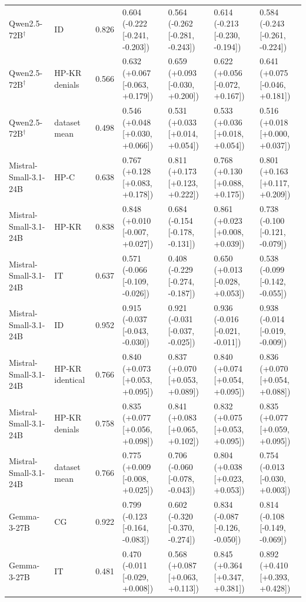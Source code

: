 \begin{table}
{\begin{tabular}{lllllll}
Qwen2.5-72B$^\dagger$ & ID & 0.826 & 0.604 (-0.222 [-0.241, -0.203]) & 0.564 (-0.262 [-0.281, -0.243]) & 0.614 (-0.213 [-0.230, -0.194]) & 0.584 (-0.243 [-0.261, -0.224]) \\
Qwen2.5-72B$^\dagger$ & HP-KR denials & 0.566 & 0.632 (+0.067 [-0.063, +0.179]) & 0.659 (+0.093 [-0.030, +0.200]) & 0.622 (+0.056 [-0.072, +0.167]) & 0.641 (+0.075 [-0.046, +0.181]) \\
Qwen2.5-72B$^\dagger$ & dataset mean & 0.498 & 0.546 (+0.048 [+0.030, +0.066]) & 0.531 (+0.033 [+0.014, +0.054]) & 0.533 (+0.036 [+0.018, +0.054]) & 0.516 (+0.018 [+0.000, +0.037]) \\
Mistral-Small-3.1-24B & HP-C & 0.638 & 0.767 (+0.128 [+0.083, +0.178]) & 0.811 (+0.173 [+0.123, +0.222]) & 0.768 (+0.130 [+0.088, +0.175]) & 0.801 (+0.163 [+0.117, +0.209]) \\
Mistral-Small-3.1-24B & HP-KR & 0.838 & 0.848 (+0.010 [-0.007, +0.027]) & 0.684 (-0.154 [-0.178, -0.131]) & 0.861 (+0.023 [+0.008, +0.039]) & 0.738 (-0.100 [-0.121, -0.079]) \\
Mistral-Small-3.1-24B & IT & 0.637 & 0.571 (-0.066 [-0.109, -0.026]) & 0.408 (-0.229 [-0.274, -0.187]) & 0.650 (+0.013 [-0.028, +0.053]) & 0.538 (-0.099 [-0.142, -0.055]) \\
Mistral-Small-3.1-24B & ID & 0.952 & 0.915 (-0.037 [-0.043, -0.030]) & 0.921 (-0.031 [-0.037, -0.025]) & 0.936 (-0.016 [-0.021, -0.011]) & 0.938 (-0.014 [-0.019, -0.009]) \\
Mistral-Small-3.1-24B & HP-KR identical & 0.766 & 0.840 (+0.073 [+0.053, +0.095]) & 0.837 (+0.070 [+0.053, +0.089]) & 0.840 (+0.074 [+0.054, +0.095]) & 0.836 (+0.070 [+0.054, +0.088]) \\
Mistral-Small-3.1-24B & HP-KR denials & 0.758 & 0.835 (+0.077 [+0.056, +0.098]) & 0.841 (+0.083 [+0.065, +0.102]) & 0.832 (+0.075 [+0.053, +0.095]) & 0.835 (+0.077 [+0.059, +0.095]) \\
Mistral-Small-3.1-24B & dataset mean & 0.766 & 0.775 (+0.009 [-0.008, +0.025]) & 0.706 (-0.060 [-0.078, -0.043]) & 0.804 (+0.038 [+0.023, +0.053]) & 0.754 (-0.013 [-0.030, +0.003]) \\
Gemma-3-27B & CG & 0.922 & 0.799 (-0.123 [-0.164, -0.083]) & 0.602 (-0.320 [-0.370, -0.274]) & 0.834 (-0.087 [-0.126, -0.050]) & 0.814 (-0.108 [-0.149, -0.069]) \\
Gemma-3-27B & IT & 0.481 & 0.470 (-0.011 [-0.029, +0.008]) & 0.568 (+0.087 [+0.063, +0.113]) & 0.845 (+0.364 [+0.347, +0.381]) & 0.892 (+0.410 [+0.393, +0.428]) \\

\end{tabular}}
\end{table}
